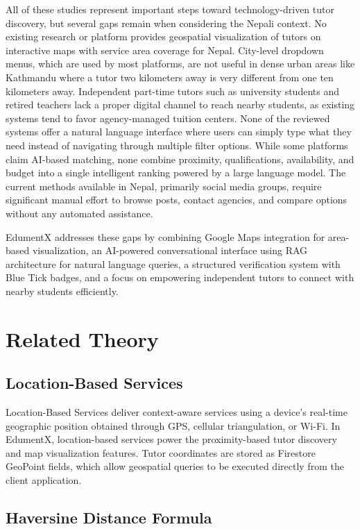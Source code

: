 \documentclass[12pt]{report}
\begin{document}
\noindent All of these studies represent important steps toward technology-driven tutor discovery, but several gaps remain when considering the Nepali context. No existing research or platform provides geospatial visualization of tutors on interactive maps with service area coverage for Nepal. City-level dropdown menus, which are used by most platforms, are not useful in dense urban areas like Kathmandu where a tutor two kilometers away is very different from one ten kilometers away. Independent part-time tutors such as university students and retired teachers lack a proper digital channel to reach nearby students, as existing systems tend to favor agency-managed tuition centers. None of the reviewed systems offer a natural language interface where users can simply type what they need instead of navigating through multiple filter options. While some platforms claim AI-based matching, none combine proximity, qualifications, availability, and budget into a single intelligent ranking powered by a large language model. The current methods available in Nepal, primarily social media groups, require significant manual effort to browse posts, contact agencies, and compare options without any automated assistance.

\noindent EdumentX addresses these gaps by combining Google Maps integration for area-based visualization, an AI-powered conversational interface using RAG architecture for natural language queries, a structured verification system with Blue Tick badges, and a focus on empowering independent tutors to connect with nearby students efficiently.

\section{Related Theory}

\subsection{Location-Based Services}

Location-Based Services deliver context-aware services using a device's real-time geographic position obtained through GPS, cellular triangulation, or Wi-Fi. In EdumentX, location-based services power the proximity-based tutor discovery and map visualization features. Tutor coordinates are stored as Firestore GeoPoint fields, which allow geospatial queries to be executed directly from the client application.

\subsection{Haversine Distance Formula}
\end{document}
